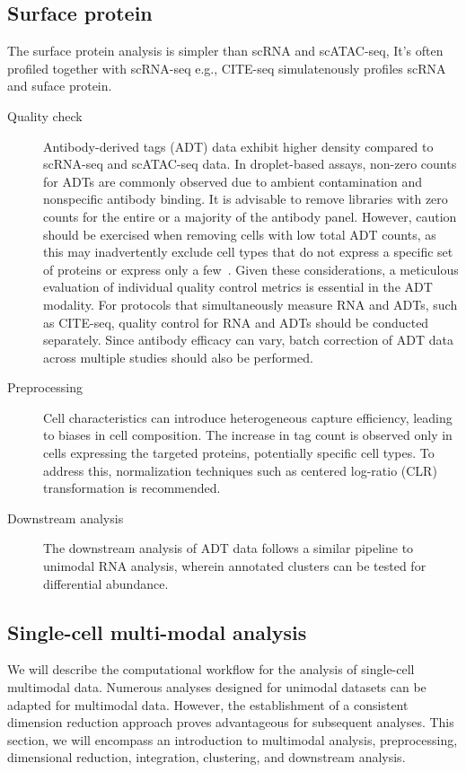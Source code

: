 \subsection{Surface protein}
\label{background:sec2:protein}
The surface protein analysis is simpler than scRNA and scATAC-seq, It's often profiled together with scRNA-seq e.g., CITE-seq simulatenously profiles scRNA and suface protein.
\begin{description}
	\item[Quality check] 
	Antibody-derived tags (ADT) data exhibit higher density compared to scRNA-seq and scATAC-seq data. In droplet-based assays, non-zero counts for ADTs are commonly observed due to ambient contamination and nonspecific antibody binding. It is advisable to remove libraries with zero counts for the entire or a majority of the antibody panel. However, caution should be exercised when removing cells with low total ADT counts, as this may inadvertently exclude cell types that do not express a specific set of proteins or express only a few~\citep{amezquita2020adtqc}. Given these considerations, a meticulous evaluation of individual quality control metrics is essential in the ADT modality. For protocols that simultaneously measure RNA and ADTs, such as CITE-seq, quality control for RNA and ADTs should be conducted separately. Since antibody efficacy can vary, batch correction of ADT data across multiple studies should also be performed\citep{zheng2022adtqc}.

	\item[Preprocessing]
	Cell characteristics can introduce heterogeneous capture efficiency, leading to biases in cell composition. The increase in tag count is observed only in cells expressing the targeted proteins, potentially specific cell types\citep{zheng2022adtqc}. To address this, normalization techniques such as centered log-ratio (CLR) transformation is recommended\citep{stoeckius2017simultaneous}.


	\item[Downstream analysis]
	The downstream analysis of ADT data follows a similar pipeline to unimodal RNA analysis, wherein annotated clusters can be tested for differential abundance.
\end{description}

\subsection{Single-cell multi-modal analysis}
\label{background:sec2:multimodal}
We will describe the computational workflow for the analysis of single-cell multimodal data. Numerous analyses designed for unimodal datasets can be adapted for multimodal data. However, the establishment of a consistent dimension reduction approach proves advantageous for subsequent analyses. This section, we will encompass an introduction to multimodal analysis,  preprocessing, dimensional reduction, integration, clustering, and downstream analysis.

